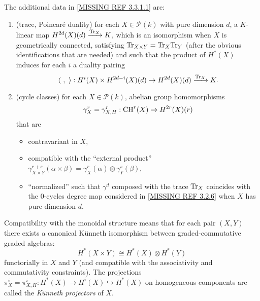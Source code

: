 \documentclass[../main.tex]{subfiles}
\begin{document}
The additional data in \ref{MISSING REF 3.3.1.1} are:
\begin{enumerate}[label=\arabic*)]
    \item (trace, Poincaré duality) for each $X \in \mathcal{P}(k)$ with pure dimension $d$, a $K$-linear map $H^{2d}(X)(d) \xrightarrow{\mathrm{Tr}_X} K$, which is an isomorphism when $X$ is geometrically connected, satisfying $\mathrm{Tr}_{X \times Y} = \mathrm{Tr}_X \mathrm{Tr}_Y$ (after the obvious identifications that are needed) and such that the product of $H^*(X)$ induces for each $i$ a duality pairing
    $$\langle\ ,\ \rangle : H^i(X) \times H^{2d - i}(X)(d) \to H^{2d}(X)(d) \xrightarrow{\mathrm{Tr}_X} K.$$
    \item (cycle classes) for each $X \in \mathcal{P}(k)$, abelian group homomorphisms
    $$\gamma_X^r = \gamma_{X, H}^r : \operatorname{CH}^r(X) \to H^{2r}(X)(r)$$
    that are
    \begin{itemize}
        \item contravariant in $X$,
        \item compatible with the \enquote{external product} $\gamma_{X \times Y}^{r + s}(\alpha \times \beta) = \gamma_X^r(\alpha) \otimes \gamma_Y^s(\beta)$,
        \item \enquote{normalized} such that $\gamma^d$ composed with the trace $\mathrm{Tr}_X$ coincides with the $0$-cycles degree map considered in \ref{MISSING REF 3.2.6} when $X$ has pure dimension $d$.
    \end{itemize}
\end{enumerate}

Compatibility with the monoidal structure means that for each pair $(X, Y)$ there exists a canonical Künneth isomorphism between graded-commutative graded algebras:
$$H^*(X \times Y) \cong H^*(X) \otimes H^*(Y)$$
functorially in $X$ and $Y$ (and compatible with the associativity and commutativity constraints).
The projections $\pi_X^i = \pi_{X, H}^i : H^*(X) \to H^i(X) \hookrightarrow H^*(X)$ on homogeneous components are called the \emph{Künneth projectors} of $X$.
\end{document}
